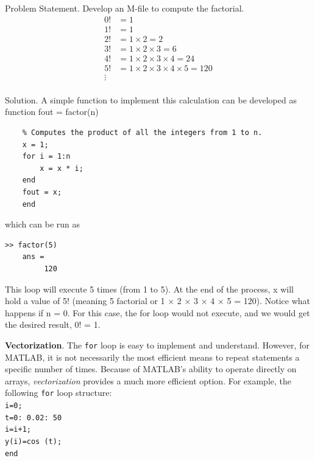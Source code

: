 \documentclass[../main.tex]{subfiles}
\begin{document}
Problem Statement. Develop an M-file to compute the factorial.
\[\begin{array}{ll}
    0!& = 1\\
    1!& = 1\\
    2!& = 1 \times 2 = 2\\
    3!& = 1 \times 2 \times 3 = 6\\
    4!& = 1 \times 2 \times 3 \times 4 = 24\\
    5!& = 1 \times 2 \times 3 \times 4 \times 5 = 120\\ 
    \vdots \\
\end{array} \]


Solution. A simple function to implement this calculation can be developed as
function fout = factor(n)
\begin{lstlisting}[frame=none, numbers=none]
    % factor(n):
    % Computes the product of all the integers from 1 to n.
    x = 1;
    for i = 1:n
        x = x * i;
    end
    fout = x;
    end
\end{lstlisting}
which can be run as
\begin{lstlisting}[frame=none, numbers=none]
    >> factor(5)
    ans =
         120
\end{lstlisting}
This loop will execute 5 times (from 1 to 5). At the end of the process, x will hold a value
of 5! (meaning 5 factorial or 1 $\times$ 2 $\times$ 3 $\times$ 4 $\times$ 5 = 120).
Notice what happens if n = 0. For this case, the for loop would not execute, and we
would get the desired result, 0! = 1.


\noindent \textbf{Vectorization}. The \texttt{for} loop is easy to implement and understand. However, for MATLAB, it is not necessarily the most efficient means to repeat statements a specific number of times. Because of MATLAB's ability to operate directly on arrays, \emph{vectorization} provides a much more efficient option. For example, the following \texttt{for} loop structure:\\




\texttt{i=0;\\
\indent t=0: 0.02: 50\\
\indent\hspace{2mm} i=i+1;\\
\indent\hspace{2mm} y(i)=cos (t);\\
\indent end}\\
\end{document}
